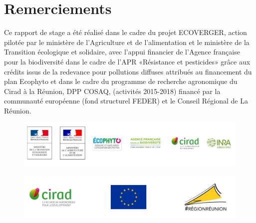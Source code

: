 \section*{Remerciements}

Ce rapport de stage a été réalisé dans le cadre du projet ECOVERGER, action pilotée par le ministère de l’Agriculture et de l’alimentation et le ministère de la Transition écologique et solidaire, avec l’appui financier de l’Agence française pour la biodiversité dans le cadre de l'APR «Résistance et pesticides» grâce aux crédits issus de la redevance pour pollutions diffuses attribués au financement du plan Ecophyto et dans le cadre du programme de recherche agronomique du Cirad à la Réunion, DPP COSAQ, (activités 2015-2018) financé par la communauté européenne (fond structurel FEDER) et le Conseil Régional de La Réunion.





\begin{figure}[!h]
 \centering
 \includegraphics[scale = 0.3]{photos/ecoverger.png}
\end{figure}



\begin{figure}[!h]
 \centering
 \includegraphics[scale = 0.3]{photos/cosaq.png}
\end{figure}
